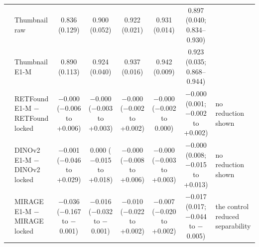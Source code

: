\begin{longtable}{@{}llcccccp{3cm}@{}}
 & Thumbnail raw & \makecell{0.836\\{\scriptsize (0.129)}} & \makecell{0.900\\{\scriptsize (0.052)}} & \makecell{0.922\\{\scriptsize (0.021)}} & \makecell{0.931\\{\scriptsize (0.014)}} & \makecell{0.897\\{\scriptsize (0.040; 0.834--0.930)}} &  \\
 & Thumbnail E1-M & \makecell{0.890\\{\scriptsize (0.113)}} & \makecell{0.924\\{\scriptsize (0.040)}} & \makecell{0.937\\{\scriptsize (0.016)}} & \makecell{0.942\\{\scriptsize (0.009)}} & \makecell{0.923\\{\scriptsize (0.035; 0.868--0.944)}} &  \\
 & RETFound E1-M $-$ RETFound locked & \makecell{$-$0.000\\{\scriptsize ($-$0.006 to +0.006)}} & \makecell{$-$0.000\\{\scriptsize ($-$0.003 to +0.003)}} & \makecell{$-$0.000\\{\scriptsize ($-$0.002 to +0.002)}} & \makecell{$-$0.000\\{\scriptsize ($-$0.002 to 0.000)}} & \makecell{$-$0.000\\{\scriptsize (0.001; $-$0.002 to +0.002)}} & no reduction shown \\
 & DINOv2 E1-M $-$ DINOv2 locked & \makecell{$-$0.001\\{\scriptsize ($-$0.046 to +0.029)}} & \makecell{0.000\\{\scriptsize ($-$0.015 to +0.018)}} & \makecell{$-$0.000\\{\scriptsize ($-$0.008 to +0.006)}} & \makecell{$-$0.000\\{\scriptsize ($-$0.003 to +0.003)}} & \makecell{$-$0.000\\{\scriptsize (0.008; $-$0.015 to +0.013)}} & no reduction shown \\
 & MIRAGE E1-M $-$ MIRAGE locked & \makecell{$-$0.036\\{\scriptsize ($-$0.167 to $-$0.001)}} & \makecell{$-$0.016\\{\scriptsize ($-$0.032 to $-$0.001)}} & \makecell{$-$0.010\\{\scriptsize ($-$0.022 to +0.002)}} & \makecell{$-$0.007\\{\scriptsize ($-$0.020 to +0.002)}} & \makecell{$-$0.017\\{\scriptsize (0.017; $-$0.044 to $-$0.005)}} & the control reduced separability \\

\end{longtable}
